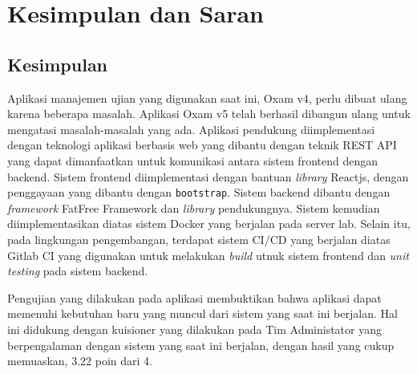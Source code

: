 \chapter{Kesimpulan dan Saran}
\label{chap:kesimpulan-saran}

\section{Kesimpulan}
    Aplikasi manajemen ujian yang digunakan saat ini, Oxam v4, perlu dibuat ulang karena beberapa masalah. 
    Aplikasi Oxam v5 telah berhasil dibangun ulang untuk mengatasi masalah-masalah yang ada.
    Aplikasi pendukung diimplementasi dengan teknologi aplikasi berbasis web yang dibantu dengan teknik REST API
    yang dapat dimanfaatkan untuk komunikasi antara sistem frontend dengan backend. Sistem frontend diimplementasi
    dengan bantuan \textit{library} Reactjs, dengan penggayaan yang dibantu dengan \texttt{bootstrap}. Sistem
    backend dibantu dengan \textit{framework} FatFree Framework dan \textit{library} pendukungnya. Sistem
    kemudian diimplementasikan diatas sistem Docker yang berjalan pada server lab. Selain itu, pada lingkungan
    pengembangan, terdapat sistem CI/CD yang berjalan diatas Gitlab CI yang digunakan untuk melakukan
    \textit{build} utnuk sistem frontend dan \textit{unit testing} pada sistem backend.
    
    Pengujian yang dilakukan pada aplikasi membuktikan  bahwa aplikasi dapat memenuhi kebutuhan baru yang muncul
    dari sistem yang saat ini berjalan. Hal ini didukung dengan kuisioner yang dilakukan pada Tim Administator
    yang berpengalaman dengan sistem yang saat ini berjalan, dengan hasil yang cukup memuaskan, 3.22 poin dari 4.
    
